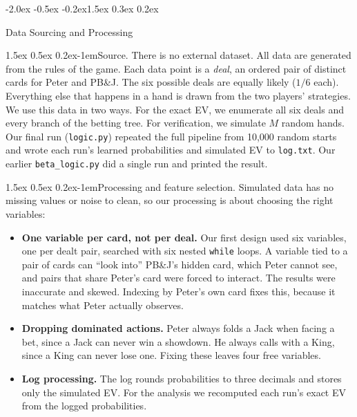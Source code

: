 \documentclass{article}
\makeatletter
\renewcommand{\section}{\@startsection{section}{1}{\z@}%
    {-2.0ex \@plus -0.5ex \@minus -0.2ex}{1.5ex \@plus 0.3ex \@minus 0.2ex}%
    {\large\bf\raggedright}}
\renewcommand{\paragraph}{\@startsection{paragraph}{4}{\z@}%
    {1.5ex \@plus 0.5ex \@minus 0.2ex}{-1em}{\normalsize\bf}}
\newcommand{\code}[1]{\texttt{#1}}
\newcommand{\peter}{Peter}
\newcommand{\pbj}{PB\&J}
\makeatother
\begin{document}
\section{Data Sourcing and Processing}

\paragraph{Source.} There is no external dataset. All data are generated
from the rules of the game. Each data point is a \emph{deal}, an ordered pair
of distinct cards for \peter{} and \pbj{}. The six possible deals are equally
likely ($1/6$ each). Everything else that happens in a hand is drawn from the
two players' strategies. We use this data in two ways. For the exact EV, we
enumerate all six deals and every branch of the betting tree. For
verification, we simulate $M$ random hands. Our final run (\code{logic.py})
repeated the full pipeline from 10{,}000 random starts and wrote each run's
learned probabilities and simulated EV to \code{log.txt}. Our earlier
\code{beta\_logic.py} did a single run and printed the result.

\paragraph{Processing and feature selection.} Simulated data has no missing
values or noise to clean, so our processing is about choosing the right
variables:
\begin{itemize}\itemsep0pt
  \item \textbf{One variable per card, not per deal.} Our first design used six
  variables, one per dealt pair, searched with six nested \code{while} loops. A
  variable tied to a pair of cards can ``look into'' \pbj's hidden card, which
  \peter{} cannot see, and pairs that share \peter's card were forced to
  interact. The results were inaccurate and skewed. Indexing by \peter's own
  card fixes this, because it matches what \peter{} actually observes.
  \item \textbf{Dropping dominated actions.} \peter{} always folds a Jack when
  facing a bet, since a Jack can never win a showdown. He always calls with a
  King, since a King can never lose one. Fixing these leaves four free
  variables.
  \item \textbf{Log processing.} The log rounds probabilities to three
  decimals and stores only the simulated EV. For the analysis we recomputed
  each run's exact EV from the logged probabilities.
\end{itemize}
\end{document}
